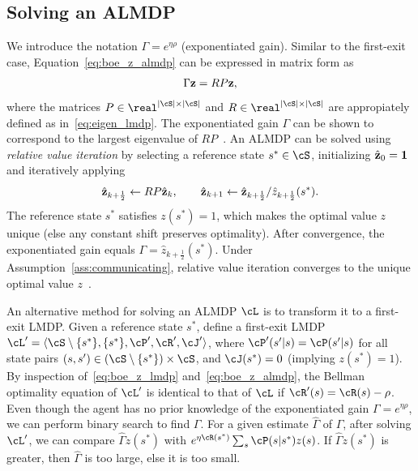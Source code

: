 \subsection{Solving an ALMDP}

We introduce the notation $\Gamma=e^{\eta\rho}$ (exponentiated gain). Similar to the first-exit case, Equation~\eqref{eq:boe_z_almdp} can be expressed in matrix form as
\begin{equation}\label{eq:rel_opt}
  \Gamma {\bf z} = R P {\bf z},
\end{equation}
where the matrices $P\in \real^{\lvert\cS\rvert\times\lvert\cS\rvert}$ and $R\in \real^{\lvert\cS\rvert\times\lvert\cS\rvert}$ are appropiately defined as in~\eqref{eq:eigen_lmdp}. The exponentiated gain $\Gamma$ can be shown to correspond to the largest eigenvalue of $RP$~\citep{Todorov2009}.
An ALMDP can be solved using {\em relative value iteration} by selecting a reference state $s^*\in\cS$, initializing $\hat{\bf z}_0={\bf 1}$ and iteratively applying
\begin{equation*}
  \hat{\bf z}_{k+\frac 1 2} \gets R P \hat{\bf z}_k, \quad \quad \hat{\bf z}_{k+1} \gets \hat{\bf z}_{k+\frac 1 2} / \hat z_{k+\frac 1 2}(s^*).
\end{equation*}
The reference state $s^*$ satisfies $z(s^*)=1$, which makes the optimal value $z$ unique (else any constant shift preserves optimality). After convergence, the exponentiated gain equals $\Gamma=\hat z_{k+\frac 1 2}(s^*)$. Under Assumption~\ref{ass:communicating}, relative value iteration converges to the unique optimal value $z$~\citep{Todorov2009}.

An alternative method for solving an ALMDP $\cL$ is to transform it to a first-exit LMDP. 
Given a reference state $s^*$, define a first-exit LMDP $\cL'=\langle\cS\setminus\{s^*\},\{s^*\},\cP',\cR',\cJ'\rangle$, where $\cP'(s'|s)=\cP(s'|s)$ for all state pairs $(s,s')\in(\cS\setminus\{s^*\})\times\cS$, and $\cJ(s^*)=0$ (implying $z(s^*)=1$). By inspection of~\eqref{eq:boe_z_lmdp} and~\eqref{eq:boe_z_almdp}, the Bellman optimality equation of $\cL'$ is identical to that of $\cL$ if $\cR'(s)=\cR(s)-\rho$. Even though the agent has no prior knowledge of the exponentiated gain $\Gamma = e^{\eta\rho}$, we can perform binary search to find $\Gamma$. For a given estimate $\hat\Gamma$ of $\Gamma$, after solving $\cL'$, we can compare $\hat \Gamma z(s^*)$ with $e^{\eta\cR(s^*)}\sum_s\cP(s|s^*)z(s)$. If $\hat \Gamma z(s^*)$ is greater, then $\hat\Gamma$ is too large, else it is too small.

